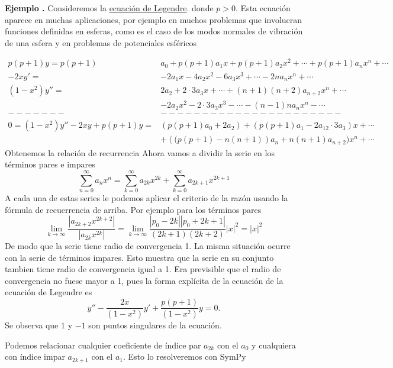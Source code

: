 \documentclass{article}
\newcounter{defi_cont}
\newcounter{lem_cont}
\newcounter{ejem_cont}
\newenvironment{ejemplo}[1]{\refstepcounter{ejem_cont}\vspace{1ex}\noindent\textbf{Ejemplo \arabic{ejem_cont}.} #1}{}
\begin{document}
\begin{ejemplo} Consideremos la \href{http://es.wikipedia.org/wiki/Polinomios_de_Legendre}{ecuación de Legendre}.
donde $p>0$. Esta ecuación aparece en muchas aplicaciones, por ejemplo en muchos problemas que involucran funciones definidas en esferas, como es el caso de los modos normales de vibración de una esfera y en problemas de potenciales esféricos

\[\begin{split}
   p(p+1)y= p(p+1)&a_0+ p(p+1)a_1x+ p(p+1)a_2x^2+\cdots+ p(p+1)a_nx^n+\cdots\\
  -2xy'=&-2a_1x-4a_2x^2-6a_3x^3+\cdots-2na_{n}x^n+\cdots\\
(1-x^2)y''=& 2a_2+2\cdot 3a_3x+\cdots +(n+1)(n+2)a_{n+2}x^n+\cdots\\
          &-2a_2x^2-2\cdot 3a_3x^3-\cdots -(n-1)na_{n}x^n-\cdots\\
     -------&----------------------\\
0=(1-x^2)y''-2xy+p(p+1)y =& (p(p+1)a_0+2a_2)+(p(p+1)a_1-2a_12\cdot 3a_3)x+\cdots\\
     &+ \left( (p(p+1)-n(n+1)\right)a_n+n(n+1)a_{n+2})x^n+\cdots
  \end{split}
\]
Obtenemos la relación de recurrencia
 Ahora vamos a dividir la serie en los términos pares e impares
\[\sum\limits_{n=0}^{\infty}a_nx^n= \sum\limits_{k=0}^{\infty}a_{2k}x^{2k}+\sum\limits_{k=0}^{\infty}a_{2k+1}x^{2k+1}\]
A cada una de estas series le podemos aplicar el criterio de la razón usando la fórmula de recuerrencia de arriba. Por ejemplo para los términos pares
\[\lim\limits_{k\to\infty}\frac{|a_{2k+2}x^{2k+2}|}{|a_{2k}x^{2k}|}=\lim\limits_{k\to\infty}\frac{|p_0-2k||p_0+2k+1|}{(2k+1)(2k+2)}|x|^2=|x|^2\]
De modo que la serie tiene radio de convergencia 1. La misma situación ocurre con la serie de términos impares. Esto muestra que la serie en su conjunto tambien tiene radio de convergencia igual a 1. Era previsible que el radio de convergencia no fuese mayor a 1, pues la forma explícita de la ecuación de la ecuación de Legendre es
\[y''-\frac{2x}{(1-x^2)}y'+\frac{p(p+1)}{(1-x^2)}y=0.\]
Se observa que $1$ y $-1$ son puntos singulares de la ecuación.

Podemos relacionar cualquier coeficiente de índice par $a_{2k}$ con el $a_0$ y cualquiera con índice impar $a_{2k+1}$ con el $a_1$. Esto lo resolveremos con SymPy


\end{ejemplo}
\end{document}
